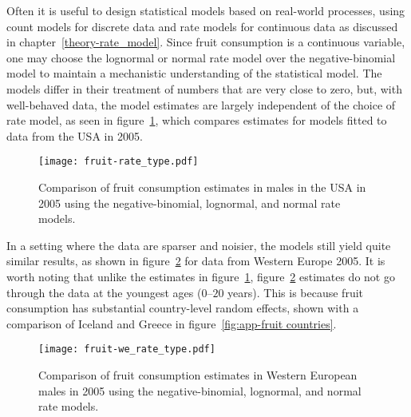 Often it is useful to design statistical models based on real-world
processes, using count models for discrete data and rate models for
continuous data as discussed in chapter~\ref{theory-rate_model}.
Since fruit consumption is a continuous variable, one may choose the
lognormal or normal rate model over the negative-binomial model to
maintain a mechanistic understanding of the statistical model.  The
models differ in their treatment of numbers that are very close to
zero, but, with well-behaved data, the model estimates are largely
independent of the choice of rate model, as seen in
figure~\ref{fig:app-fruit rate type}, which compares estimates for
models fitted to data from the USA in 2005.

    \begin{figure}[h]
        \begin{center}
            \texttt{[image: fruit-rate\_type.pdf]}
            \caption[Systematic review data for fruit consumption.]{Comparison
              of fruit consumption estimates in
              males in the USA in 2005 using the
              negative-binomial, lognormal, and normal rate models.}
            \label{fig:app-fruit rate type}
        \end{center}
    \end{figure}

In a setting where the data are sparser and noisier, the
models still yield quite similar results, as shown in figure~\ref{fig:app-fruit europe}
for data from Western Europe 2005.  It is worth noting that unlike
the estimates in figure~\ref{fig:app-fruit rate type},
figure~\ref{fig:app-fruit europe} estimates do not go through the
data at the youngest ages ($0$--$20$ years).  This is because fruit consumption has
substantial country-level random effects, shown with a comparison of
Iceland and Greece in figure~\ref{fig:app-fruit countries}.

    \begin{figure}[h]
        \begin{center}
            \texttt{[image: fruit-we\_rate\_type.pdf]}
            \caption[Comparison of regional fruit consumption estimates using different
              rate models.]{Comparison of fruit consumption estimates in
              Western European males in 2005 using the
              negative-binomial, lognormal, and normal rate models.}
            \label{fig:app-fruit europe}
        \end{center}
    \end{figure}

